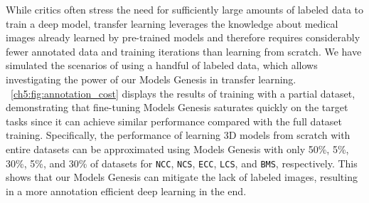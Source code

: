 While critics often stress the need for sufficiently large amounts of labeled data to train a deep model, transfer learning leverages the knowledge about medical images already learned by pre-trained models and therefore requires considerably fewer annotated data and training iterations than learning from scratch. We have simulated the scenarios of using a handful of labeled data, which allows investigating the power of our Models Genesis in transfer learning. \figurename~\ref{ch5:fig:annotation_cost} displays the results of training with a partial dataset, demonstrating that fine-tuning Models Genesis saturates quickly on the target tasks since it can achieve similar performance compared with the full dataset training. 
Specifically, the performance of learning 3D models from scratch with entire datasets can be approximated using Models Genesis with only 50\%, 5\%, 30\%, 5\%, and 30\% of datasets for \texttt{NCC}, \texttt{NCS}, \texttt{ECC}, \texttt{LCS}, and \texttt{BMS}, respectively. 
This shows that our Models Genesis can mitigate the lack of labeled images, resulting in a more annotation efficient deep learning in the end. 

